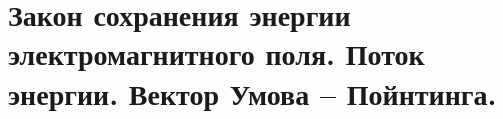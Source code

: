 \section{Закон сохранения энергии электромагнитного поля. Поток энергии. Вектор
Умова – Пойнтинга.}

